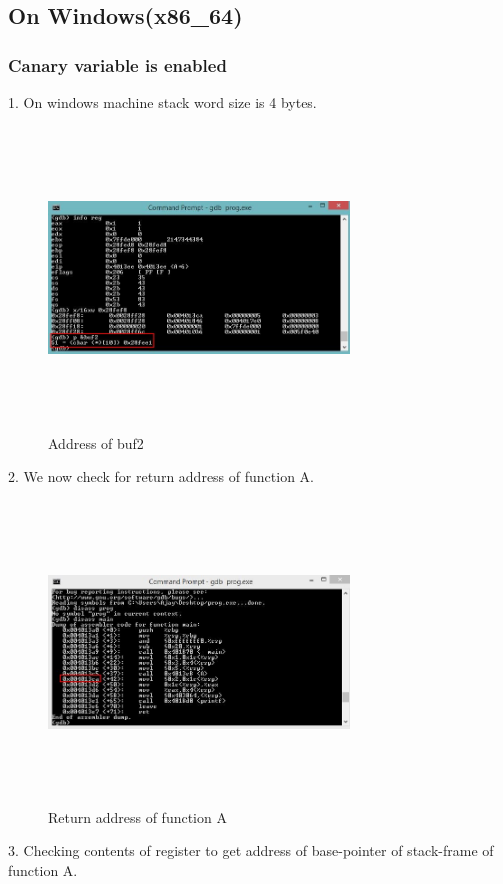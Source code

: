 \documentclass{article}
\begin{document}
 \subsection{On Windows(x86\_64)}
  \subsubsection{Canary variable is enabled}
  
  1. On windows machine stack word size is 4 bytes.
      
      \begin{figure}[H]
	\begin{center}
	 

 \includegraphics[width=8cm,height=8cm]{buf2addr.JPG}
	\caption{Address of buf2}
		\end{center}
	\end{figure}
  2. We now check for return address of function A.
       
       
      \begin{figure}[H]
       \begin{center}
		\includegraphics[width=8cm,height=8cm]{disassMain.JPG}
	\caption{Return address of function A}
	\end{center}
	\end{figure}
  3. Checking contents of register to get address of base-pointer of stack-frame of function A.\\
   
\end{document}
